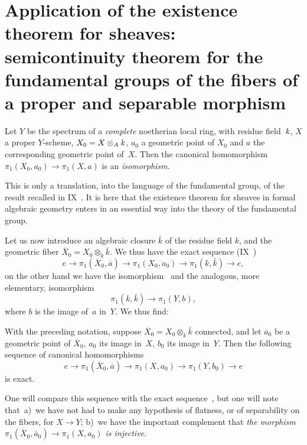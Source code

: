 \section[Application of the existence theorem for sheaves]{Application of the existence theorem for sheaves:
semicontinuity theorem for the fundamental groups
of the fibers of a proper and separable morphism}
\label{X.2}

\begin{theorem}
\label{X.2.1}
Let $Y$ be the spectrum of a \emph{complete} noetherian local ring,
with residue field~$\mathit{k}$, $X$ a proper $Y$-scheme,
$X_0=X\otimes_A \mathit{k}$, $a_0$ a geometric point of
$X_0$ and $a$ the corresponding geometric point of~$X$. Then
the canonical homomorphism $\pi_1(X_0,a_0)\to \pi_1(X,a)$ is an
\emph{isomorphism.}
\end{theorem}

This is only a translation, into the language of the fundamental group,
of the result recalled in IX~. It is here that the
existence theorem for sheaves in formal algebraic geometry enters in
an essential way into the theory of the fundamental group.

Let us now introduce an algebraic closure $\bar{k}$ of the
residue field $k$, and the geometric fiber $\overline X_0
= X_0\otimes_k \bar{k}$. We thus have the exact sequence (IX~)
$$
e\to \pi_1(\overline X_0,\overline a)\to \pi_1(X_0,a_0)\to
\pi_1(k,\bar{k})\to e,
$$
on the other hand we have the isomorphism~ and the
analogous, more elementary, isomorphism
$$
\pi_1(k,\bar{k})\to \pi_1(Y,b),
$$
where $b$ is the image of~$a$ in~$Y$. We thus find:

\begin{corollary}
\label{X.2.2}
With the preceding notation, suppose
$\overline X_0=X_0\otimes_k \bar{k}$
connected, and let $\overline a_0$ be a geometric point of
$\overline X_0$, $a_0$ its image in~$X$,
$b_0$ its image in~$Y$. Then the following sequence of canonical
homomorphisms
$$
e\to \pi_1(\overline X_0,\overline a)\to \pi_1(X,a_0)\to
\pi_1(Y,b_0)\to e
$$
is exact.
\end{corollary}

One will compare this sequence with the exact sequence~, but
one will note that~a)~we have not had to make any hypothesis of flatness,
or of separability on the fibers, for $X\to Y$; b)~we have the
important complement that \emph{the morphism $\pi_1(\overline
X_0,\overline a_0)\to \pi_1(X,a_0)$ is injective.}

